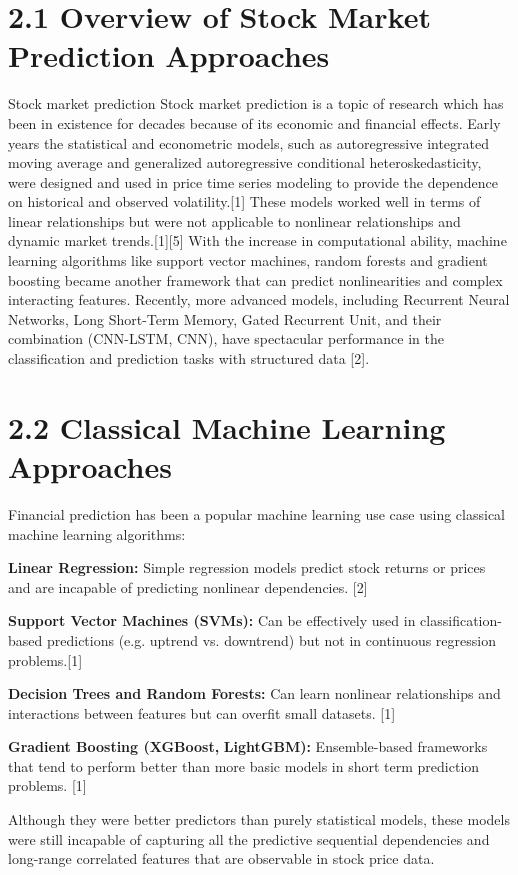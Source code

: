 \documentclass[12pt,a4paper]{report}
\begin{document}
\section{2.1 Overview of Stock Market Prediction Approaches}
Stock market prediction Stock market prediction is a topic of research which has been in existence for decades because of its economic and financial effects. Early years the statistical and econometric models, such as autoregressive integrated moving average and generalized autoregressive conditional heteroskedasticity, were designed and used in price time series modeling to provide the dependence on historical and observed volatility.[1] These models worked well in terms of linear relationships but were not applicable to nonlinear relationships and dynamic market trends.[1][5] With the increase in computational ability, machine learning algorithms like support vector machines, random forests and gradient boosting became another framework that can predict nonlinearities and complex interacting features. Recently, more advanced models, including Recurrent Neural Networks, Long Short-Term Memory, Gated Recurrent Unit, and their combination (CNN-LSTM, CNN), have spectacular performance in the classification and prediction tasks with structured data [2].

\section{2.2 Classical Machine Learning Approaches}
Financial prediction has been a popular machine learning use case using classical machine learning algorithms: 

\textbf{Linear Regression:} Simple regression models predict stock returns or prices and are incapable of predicting nonlinear dependencies. [2]

\textbf{Support Vector Machines (SVMs):} Can be effectively used in classification-based predictions (e.g. uptrend vs. downtrend) but not in continuous regression problems.[1] 

\textbf{Decision Trees and Random Forests:} Can learn nonlinear relationships and interactions between features but can overfit small datasets. [1]

\textbf{Gradient Boosting (}\textbf{XGBoost}\textbf{, }\textbf{LightGBM}\textbf{):} Ensemble-based frameworks that tend to perform better than more basic models in short term prediction problems. [1]

Although they were better predictors than purely statistical models, these models were still incapable of capturing all the predictive sequential dependencies and long-range correlated features that are observable in stock price data.
\end{document}
